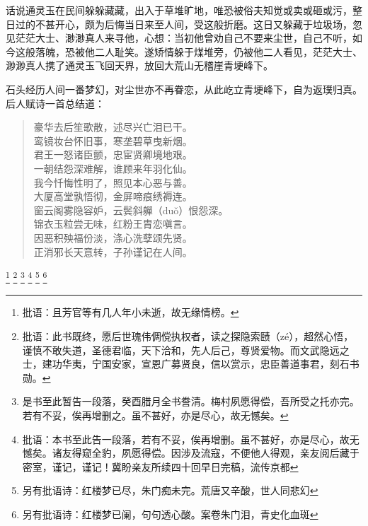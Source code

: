 \documentclass[12pt,oneside]{book}
\newenvironment{shici}{%
\begin{verse}%
\centering\large\hspace{12pt}}%
{\end{verse}}
\begin{document}
话说通灵玉在民间躲躲藏藏，出入于草堆旷地，唯恐被俗夫知觉或卖或砸或污，整日过的不甚开心，颇为后悔当日来至人间，受这般折磨。这日又躲藏于垃圾场，忽见茫茫大士、渺渺真人来寻他，心想：当初他曾劝自己不要来尘世，自己不听，如今这般落魄，恐被他二人耻笑。遂矫情躲于煤堆旁，仍被他二人看见，茫茫大士、渺渺真人携了通灵玉飞回天界，放回大荒山无稽崖青埂峰下。

石头经历人间一番梦幻，对尘世亦不再眷恋，从此屹立青埂峰下，自为返璞归真。后人赋诗一首总结道：

\begin{shici}
豪华去后笙歌散，述尽兴亡泪已干。\\
鸾镜妆台怀旧事，寒垄碧草曳新烟。\\
君王一怒诸臣颤，忠宦贤卿境地艰。\\
一朝结怨深难解，谁顾来年羽化仙。\\
我今忏悔性明了，照见本心恶与善。\\
大厦高堂孰悟彻，金屏啼痕绣褥连。\\
窗云阁雾隐容妒，云鬓斜軃（duǒ）恨怨深。\\
锦衣玉粒尝无味，红粉王胄恋嗔言。\\
因恶积殃福份淡，涤心洗孽颂先贤。\\
正消邪长天意转，子孙谨记在人间。
\end{shici}

\footnote{批语：且芳官等有几人年小未逝，故无缘情榜。}
\footnote{批语：此书既终，愿后世瑰伟倜傥执权者，读之探隐索赜（zé），超然心悟，谨慎不敢失道，圣德君临，天下洽和，先人后己，尊贤爱物。而文武隐远之士，建功华夷，宁国安家，宣恩广募贤良，信以赏示，忠臣善道事君，刻石书勋。}
\footnote{是书至此暂告一段落，癸酉腊月全书誊清。梅村夙愿得偿，吾所受之托亦完。若有不妥，俟再增删之。虽不甚好，亦是尽心，故无憾矣。}
\footnote{批语：本书至此告一段落，若有不妥，俟再增删。虽不甚好，亦是尽心，故无憾矣。诸友得窥全豹，夙愿得偿。因涉及流寇，不便他人得观，亲友阅后藏于密室，谨记，谨记！冀盼亲友所续四十回早日完稿，流传京都}
\footnote{另有批语诗：红楼梦已尽，朱门痴未完。荒唐又辛酸，世人同悲幻}
\footnote{另有批语诗：红楼梦已阑，句句透心酸。案卷朱门泪，青史化血斑}
\end{document}
